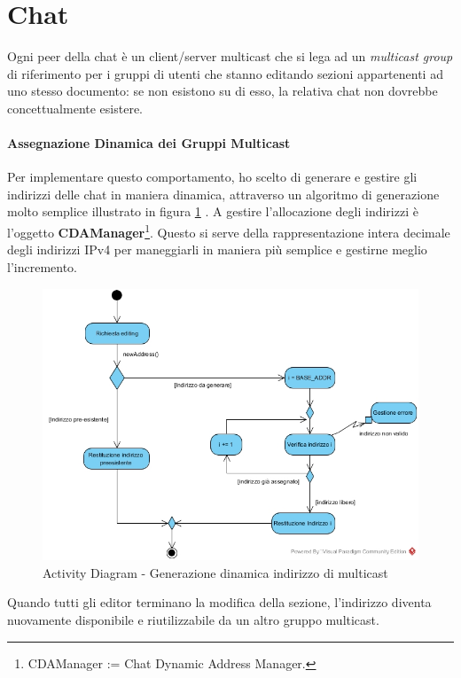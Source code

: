 \section{Chat}
Ogni peer della chat è un client/server multicast che si lega ad un \textit{multicast group} di riferimento per i gruppi di utenti che stanno editando sezioni appartenenti ad uno stesso documento: se non esistono su di esso, la relativa chat non dovrebbe concettualmente esistere.

\paragraph{Assegnazione Dinamica dei Gruppi Multicast}
Per implementare questo comportamento, ho scelto di generare e gestire gli indirizzi delle chat in maniera dinamica, attraverso un algoritmo di generazione molto semplice illustrato in figura \ref{fig:multicast_address_generation} . A gestire l'allocazione degli indirizzi è l'oggetto \textbf{CDAManager}\footnote{CDAManager := Chat Dynamic Address Manager.}. Questo si serve della rappresentazione intera decimale degli indirizzi IPv4 per maneggiarli in maniera più semplice e gestirne meglio l'incremento.

\begin{figure}[h]
	\caption{Activity Diagram - Generazione dinamica indirizzo di multicast}
	\label{fig:multicast_address_generation}
	\includegraphics[scale=0.5]{assets/multicast_address_generation_algorithm.jpg}
\end{figure}

Quando tutti gli editor terminano la modifica della sezione, l'indirizzo diventa nuovamente disponibile e riutilizzabile da un altro gruppo multicast.

